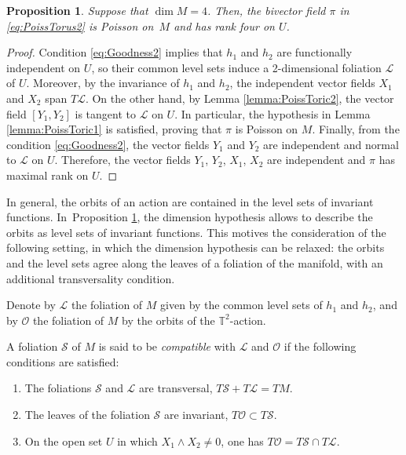 \documentclass[pdftex]{sigma}%
\numberwithin{equation}{section}
\newtheorem{Proposition}[Theorem]{Proposition}
 { \theoremstyle{definition}
\newtheorem{Definition}[Theorem]{Definition}
\newtheorem{Note}[Theorem]{Note}
\newtheorem{Example}[Theorem]{Example}
\newtheorem{Remark}[Theorem]{Remark} }
\begin{document}
\begin{Proposition}\label{prop:2Toric}
Suppose that $\operatorname{dim}{M} = 4$. Then, the bivector field $\pi$ in \eqref{eq:PoissTorus2} is Poisson on~$M$ and has rank four on $U$.
\end{Proposition}
\begin{proof}
Condition \eqref{eq:Goodness2} implies that $h_{1}$ and $h_{2}$ are functionally independent on $U$, so their common level sets induce a 2-dimensional foliation $\mathcal{L}$ of $U$. Moreover, by the invariance of $h_{1}$ and $h_{2}$, the independent vector fields $X_{1}$ and $X_{2}$ span $T\mathcal{L}$. On the other hand, by Lemma \ref{lemma:PoissToric2}, the vector field $[Y_1,Y_2]$ is tangent to $\mathcal{L}$ on $U$. In particular, the hypothesis in Lemma \ref{lemma:PoissToric1} is satisfied, proving that $\pi$ is Poisson on $M$. Finally, from the condition \eqref{eq:Goodness2}, the vector fields $Y_1$ and $Y_2$ are independent and normal to $\mathcal{L}$ on $U$. Therefore, the vector fields $Y_1$, $Y_2$, $X_1$, $X_2$ are independent and $\pi$ has maximal rank on $U$.
\end{proof}

In general, the orbits of an action are contained in the level sets of invariant functions. In~Pro\-position \ref{prop:2Toric}, the dimension hypothesis allows to describe the orbits as level sets of invariant functions. This motives the consideration of the following setting, in which the dimension hypothesis can be relaxed: the orbits and the level sets agree along the leaves of a foliation of the manifold, with an additional transversality condition.

Denote by $\mathcal{L}$ the foliation of $M$ given by the common level sets of $h_1$ and $h_2$, and by $\mathcal{O}$ the foliation of $M$ by the orbits of the $\mathbb{T}^2$-action.

\begin{Definition}\label{def:compat}
A foliation $\mathcal{S}$ of $M$ is said to be \emph{compatible} with $\mathcal{L}$ and $\mathcal{O}$ if the following conditions are satisfied:
 \begin{enumerate}\itemsep=0pt
 \item The foliations $\mathcal{S}$ and $\mathcal{L}$ are transversal, $T\mathcal{S} + T\mathcal{L} = TM$.
 \item The leaves of the foliation $\mathcal{S}$ are invariant, $T\mathcal{O} \subset T\mathcal{S}$.
 \item On the open set $U$ in which $X_1 \wedge X_2 \neq 0$, one has $T\mathcal{O} = T\mathcal{S} \cap T\mathcal{L}$.
 \end{enumerate}
\end{Definition}
\end{document}
